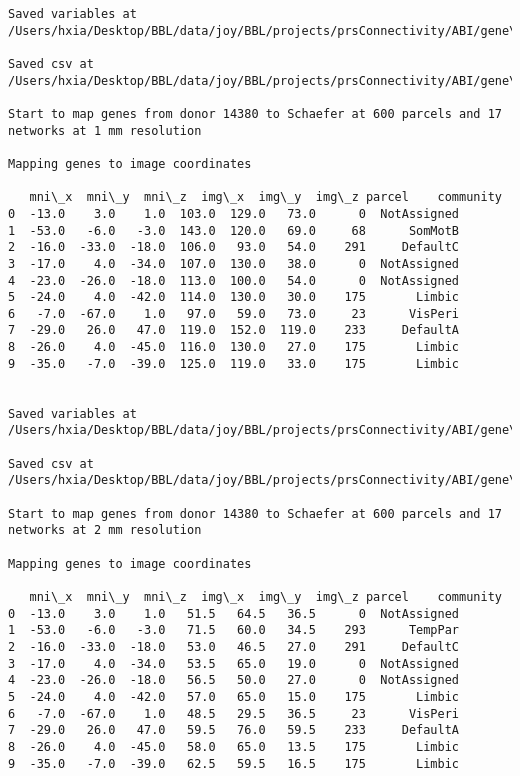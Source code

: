 \documentclass[11pt]{article}
\begin{document}
\begin{Verbatim}[commandchars=\\\{\}]
Saved variables at /Users/hxia/Desktop/BBL/data/joy/BBL/projects/prsConnectivity/ABI/gene\_mapping/14380donor\_600Parcels\_7Network\_2mm.pkl

Saved csv at /Users/hxia/Desktop/BBL/data/joy/BBL/projects/prsConnectivity/ABI/gene\_mapping/14380donor\_600Parcels\_7Network\_2mm.csv

Start to map genes from donor 14380 to Schaefer at 600 parcels and 17 networks at 1 mm resolution

Mapping genes to image coordinates

   mni\_x  mni\_y  mni\_z  img\_x  img\_y  img\_z parcel    community
0  -13.0    3.0    1.0  103.0  129.0   73.0      0  NotAssigned
1  -53.0   -6.0   -3.0  143.0  120.0   69.0     68      SomMotB
2  -16.0  -33.0  -18.0  106.0   93.0   54.0    291     DefaultC
3  -17.0    4.0  -34.0  107.0  130.0   38.0      0  NotAssigned
4  -23.0  -26.0  -18.0  113.0  100.0   54.0      0  NotAssigned
5  -24.0    4.0  -42.0  114.0  130.0   30.0    175       Limbic
6   -7.0  -67.0    1.0   97.0   59.0   73.0     23      VisPeri
7  -29.0   26.0   47.0  119.0  152.0  119.0    233     DefaultA
8  -26.0    4.0  -45.0  116.0  130.0   27.0    175       Limbic
9  -35.0   -7.0  -39.0  125.0  119.0   33.0    175       Limbic


Saved variables at /Users/hxia/Desktop/BBL/data/joy/BBL/projects/prsConnectivity/ABI/gene\_mapping/14380donor\_600Parcels\_17Network\_1mm.pkl

Saved csv at /Users/hxia/Desktop/BBL/data/joy/BBL/projects/prsConnectivity/ABI/gene\_mapping/14380donor\_600Parcels\_17Network\_1mm.csv

Start to map genes from donor 14380 to Schaefer at 600 parcels and 17 networks at 2 mm resolution

Mapping genes to image coordinates

   mni\_x  mni\_y  mni\_z  img\_x  img\_y  img\_z parcel    community
0  -13.0    3.0    1.0   51.5   64.5   36.5      0  NotAssigned
1  -53.0   -6.0   -3.0   71.5   60.0   34.5    293      TempPar
2  -16.0  -33.0  -18.0   53.0   46.5   27.0    291     DefaultC
3  -17.0    4.0  -34.0   53.5   65.0   19.0      0  NotAssigned
4  -23.0  -26.0  -18.0   56.5   50.0   27.0      0  NotAssigned
5  -24.0    4.0  -42.0   57.0   65.0   15.0    175       Limbic
6   -7.0  -67.0    1.0   48.5   29.5   36.5     23      VisPeri
7  -29.0   26.0   47.0   59.5   76.0   59.5    233     DefaultA
8  -26.0    4.0  -45.0   58.0   65.0   13.5    175       Limbic
9  -35.0   -7.0  -39.0   62.5   59.5   16.5    175       Limbic



\end{Verbatim}
\end{document}
